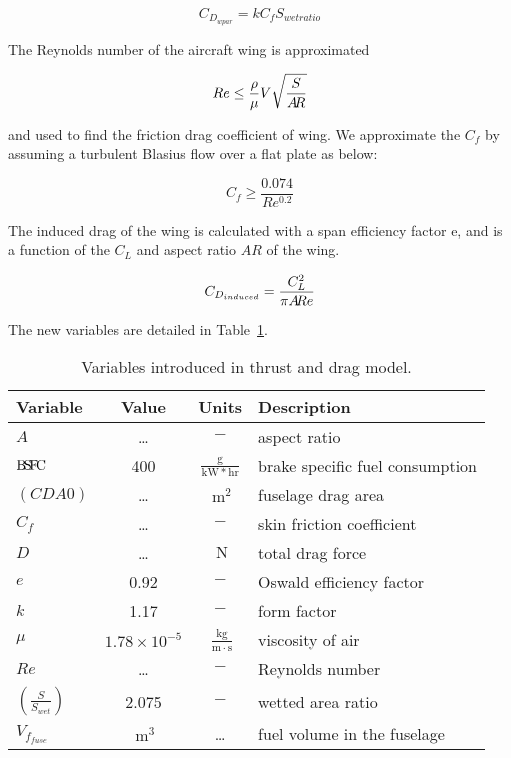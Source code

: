 \begin{equation}
    C_{D_{wpar}} = k C_f S_{wetratio}
\label{e:cdwpar}
\end{equation}

The Reynolds number of the aircraft wing is approximated

\begin{equation}
    Re \leq \frac{\rho}{\mu} V \sqrt{\frac{S}{A\hspace{-2.0pt}R}}
\label{e:re}
\end{equation}

and used to find the friction drag coefficient of wing. We approximate the $C_f$ by assuming a
turbulent Blasius flow over a flat plate as below:

\begin{equation}
    C_f \geq \frac{0.074} {Re^{0.2}}
\end{equation}

The induced drag of the wing is calculated with a span efficiency factor e, and is a
function of the $C_L$ and aspect ratio $AR$ of the wing.

\begin{equation}
    C_{D_{induced}} = \frac{C_L^2}{\pi A\hspace{-2.0pt}R e}
\label{e:cdinduced}
\end{equation}

The new variables are detailed in Table~\ref{t:vars_TandD}.

\begin{footnotesize}
\begin{table}
    \centering
    \begin{tabular}{ l c c l}
        \toprule
        \textbf{Variable} & \textbf{Value} & \textbf{Units} & \textbf{Description} \\
        \midrule
        $A$ & \ldots & $-$ & aspect ratio\\
        ${\rm B\!S\!F\!C}$ & 400 & $\mathrm{\frac{g}{kW*hr}}$ & brake specific fuel consumption \\
        $(CDA0)$ & \ldots & $~\mathrm{m^{2}}$ & fuselage drag area \\
        $C_f$ & \ldots & $-$ & skin friction coefficient \\
        $D$ & \ldots & $~\mathrm{N}$ & total drag force \\
        $e$ & 0.92 & $-$ & Oswald efficiency factor \\
        $k$ & 1.17 & $-$ & form factor \\
        $\mu$ & $\mathrm{1.78 \times 10^{-5}}$ & $~\mathrm{\tfrac{kg}{m\cdot s}}$ & viscosity of air \\
        $Re$ & \ldots & $-$ & Reynolds number \\
        $\left(\frac{S}{S_{wet}}\right)$ & 2.075 & $-$ & wetted area ratio \\
        $V_{f_{fuse}}$ & $~\mathrm{m^{3}}$ & \ldots & fuel volume in the fuselage \\
        \bottomrule
    \end{tabular}
    \caption{Variables introduced in thrust and drag model.}
    \label{t:vars_TandD}
\end{table} \end{footnotesize}


